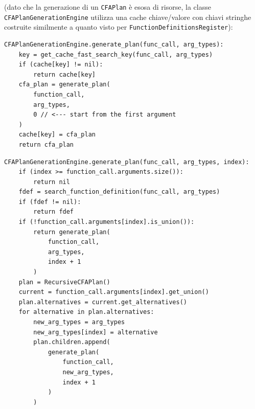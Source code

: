 (dato che la generazione di un \texttt{CFAPlan} è esosa di risorse, la classe \texttt{CFAPlanGenerationEngine} 
utilizza una cache chiave/valore con chiavi stringhe costruite similmente a quanto visto per \texttt{FunctionDefinitionsRegister}): \\

\vspace{0.5cm}
\begin{lstlisting}[frame=single]
CFAPlanGenerationEngine.generate_plan(func_call, arg_types): 
    key = get_cache_fast_search_key(func_call, arg_types)
    if (cache[key] != nil):
        return cache[key]
    cfa_plan = generate_plan(
        function_call, 
        arg_types, 
        0 // <--- start from the first argument
    )
    cache[key] = cfa_plan
    return cfa_plan
\end{lstlisting}
\vspace{0.5cm}

\vspace{0.5cm}
\begin{lstlisting}[frame=single]
CFAPlanGenerationEngine.generate_plan(func_call, arg_types, index): 
    if (index >= function_call.arguments.size()):
        return nil
    fdef = search_function_definition(func_call, arg_types)
    if (fdef != nil):
        return fdef 
    if (!function_call.arguments[index].is_union()):
        return generate_plan(
            function_call, 
            arg_types, 
            index + 1
        )
    plan = RecursiveCFAPlan()
    current = function_call.arguments[index].get_union()
    plan.alternatives = current.get_alternatives()
    for alternative in plan.alternatives:
        new_arg_types = arg_types
        new_arg_types[index] = alternative
        plan.children.append(
            generate_plan(
                function_call, 
                new_arg_types, 
                index + 1
            )
        )
\end{lstlisting}
\vspace{0.5cm}